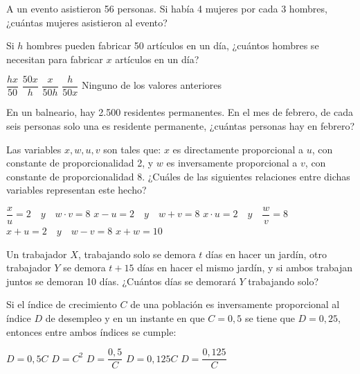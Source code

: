 \documentclass[pagina vacia]{srs}
\begin{document}
\begin{preguntas}
\pregunta A un evento asistieron 56 personas. Si había 4 mujeres por cada 3
hombres, ¿cuántas mujeres asistieron al evento?
\begin{vertical}
\end{vertical}

\pregunta Si $h$ hombres pueden fabricar 50 artículos en un día,
¿cuántos hombres se necesitan para fabricar $x$ artículos en un día?
\begin{vertical}
\alternativa $\dfrac{hx}{50}$
\alternativa $\dfrac{50x}{h}$
\alternativa $\dfrac{x}{50h}$
\alternativa $\dfrac{h}{50x}$
\alternativa Ninguno de los valores anteriores
\end{vertical}

\pregunta En un balneario, hay 2.500 residentes permanentes. En el
mes de febrero, de cada seis personas solo una es residente permanente,
¿cuántas personas hay en febrero?
\begin{vertical}
\end{vertical}

\pregunta Las variables $x, w, u, v$ son tales que: $x$ es directamente
 proporcional a $u$, con constante de proporcionalidad 2, y $w$ es
 inversamente proporcional a $v$, con constante de proporcionalidad 8.
 ¿Cuáles de las siguientes relaciones entre dichas variables representan este hecho?
\begin{vertical}
\alternativa $\dfrac{x}{u}=2 \quad y \quad w \cdot v=8$
\alternativa $x-u=2 \quad y \quad w+v=8$
\alternativa $x \cdot u=2 \quad y \quad \dfrac{w}{v}=8$
\alternativa $x+u=2 \quad y \quad w-v=8$
\alternativa $x+w=10$
\end{vertical}

\pregunta Un trabajador $X$, trabajando solo se demora $t$ días en hacer
un jardín, otro trabajador $Y$ se demora $t+15$ días en hacer el mismo
jardín, y si ambos trabajan juntos se demoran 10 días. ¿Cuántos días se
demorará $Y$ trabajando solo?
\begin{vertical}
\end{vertical}

\pregunta Si el índice de crecimiento $C$ de una población es inversamente
proporcional al índice $D$ de desempleo y en un instante en que $C=0,5$ se
tiene que $D=0,25$, entonces entre ambos índices se cumple:
\begin{vertical}
\alternativa $D=0,5C$
\alternativa $D=C^2$
\alternativa $D=\dfrac{0,5}{C}$
\alternativa $D=0,125C$
\alternativa $D=\dfrac{0,125}{C}$
\end{vertical}


\end{preguntas}
\end{document}
